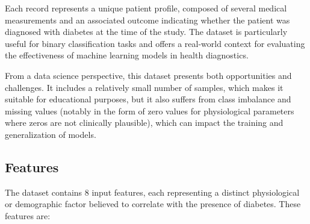 \documentclass[12pt]{article}
\begin{document}
Each record represents a unique patient profile, composed of several medical measurements and an associated outcome indicating whether the patient was diagnosed with diabetes at the time of the study. The dataset is particularly useful for binary classification tasks and offers a real-world context for evaluating the effectiveness of machine learning models in health diagnostics.

From a data science perspective, this dataset presents both opportunities and challenges. It includes a relatively small number of samples, which makes it suitable for educational purposes, but it also suffers from class imbalance and missing values (notably in the form of zero values for physiological parameters where zeros are not clinically plausible), which can impact the training and generalization of models.

\subsection{Features}

The dataset contains 8 input features, each representing a distinct physiological or demographic factor believed to correlate with the presence of diabetes. These features are:
\end{document}
